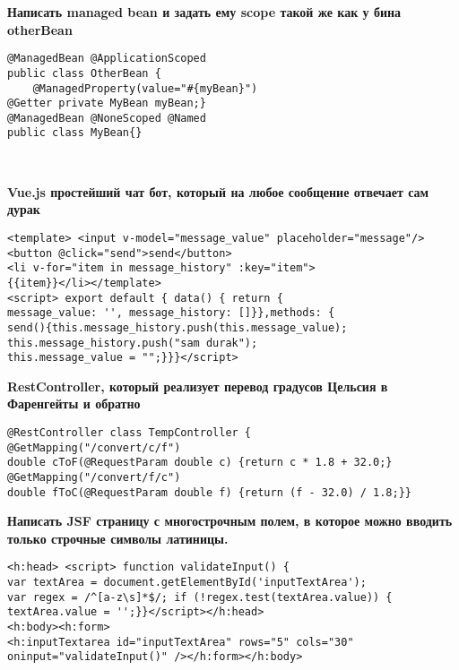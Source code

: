 \documentclass{article}
\begin{document}
\hfill
\begin{minipage}[t]{0.3\textwidth}
    \textbf{Написать managed bean и задать ему scope такой же как у бина otherBean}
    \begin{lstlisting}[frame=single, basicstyle=\tiny\ttfamily, breaklines=true, breakatwhitespace=true, postbreak=\mbox{\textcolor{red}{$\hookrightarrow$}\space}]
@ManagedBean @ApplicationScoped
public class OtherBean {
    @ManagedProperty(value="#{myBean}")
@Getter private MyBean myBean;}
@ManagedBean @NoneScoped @Named
public class MyBean{}
    \end{lstlisting}
\end{minipage}%
\\

\begin{minipage}[t]{0.3\textwidth}
    \textbf{Vue.js простейший чат бот, который на любое сообщение отвечает сам дурак}
    \begin{lstlisting}[frame=single, basicstyle=\tiny\ttfamily, breaklines=true, breakatwhitespace=true, postbreak=\mbox{\textcolor{red}{$\hookrightarrow$}\space}]
<template> <input v-model="message_value" placeholder="message"/> 
<button @click="send">send</button> 
<li v-for="item in message_history" :key="item"> 
{{item}}</li></template> 
<script> export default { data() { return { 
message_value: '', message_history: []}},methods: { 
send(){this.message_history.push(this.message_value); 
this.message_history.push("sam durak"); 
this.message_value = "";}}}</script>
    \end{lstlisting}
\end{minipage}%
\hfill
\begin{minipage}[t]{0.3\textwidth}
    \textbf{RestController, который реализует перевод градусов Цельсия в Фаренгейты и обратно}
    \begin{lstlisting}[frame=single, basicstyle=\tiny\ttfamily, breaklines=true, breakatwhitespace=true, postbreak=\mbox{\textcolor{red}{$\hookrightarrow$}\space}]
@RestController class TempController {
@GetMapping("/convert/c/f")
double cToF(@RequestParam double c) {return c * 1.8 + 32.0;}
@GetMapping("/convert/f/c")
double fToC(@RequestParam double f) {return (f - 32.0) / 1.8;}}
    \end{lstlisting}
\end{minipage}%
\hfill
\begin{minipage}[t]{0.3\textwidth}
    \textbf{Написать JSF страницу с многострочным полем, в которое можно вводить только строчные символы латиницы.}
    \begin{lstlisting}[frame=single, basicstyle=\tiny\ttfamily, breaklines=true, breakatwhitespace=true, postbreak=\mbox{\textcolor{red}{$\hookrightarrow$}\space}]
<h:head> <script> function validateInput() {
var textArea = document.getElementById('inputTextArea');
var regex = /^[a-z\s]*$/; if (!regex.test(textArea.value)) {
textArea.value = '';}}</script></h:head>
<h:body><h:form>
<h:inputTextarea id="inputTextArea" rows="5" cols="30" oninput="validateInput()" /></h:form></h:body>
    \end{lstlisting}
\end{minipage}%
\\
\end{document}
